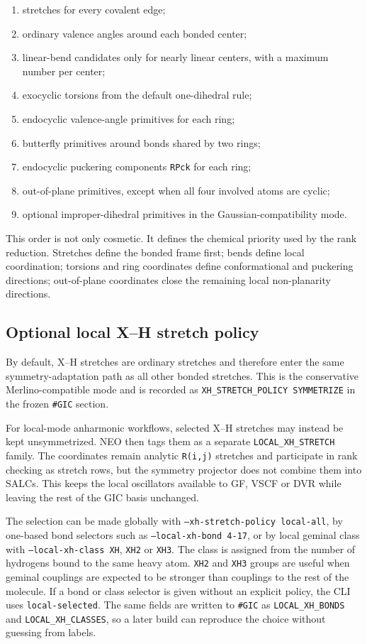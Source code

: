 \documentclass[11pt]{article}
\begin{document}
\begin{enumerate}
  \item stretches for every covalent edge;
  \item ordinary valence angles around each bonded center;
  \item linear-bend candidates only for nearly linear centers, with a maximum
        number per center;
  \item exocyclic torsions from the default one-dihedral rule;
  \item endocyclic valence-angle primitives for each ring;
  \item butterfly primitives around bonds shared by two rings;
  \item endocyclic puckering components \texttt{RPck} for each ring;
  \item out-of-plane primitives, except when all four involved atoms are cyclic;
  \item optional improper-dihedral primitives in the Gaussian-compatibility mode.
\end{enumerate}

This order is not only cosmetic.  It defines the chemical priority used by the
rank reduction.  Stretches define the bonded frame first; bends define local
coordination; torsions and ring coordinates define conformational and
puckering directions; out-of-plane coordinates close the remaining local
non-planarity directions.

\subsection{Optional local X--H stretch policy}

By default, X--H stretches are ordinary stretches and therefore enter the same
symmetry-adaptation path as all other bonded stretches.  This is the conservative
Merlino-compatible mode and is recorded as
\texttt{XH\_STRETCH\_POLICY SYMMETRIZE} in the frozen \texttt{\#GIC} section.

For local-mode anharmonic workflows, selected X--H stretches may instead be kept
unsymmetrized.  NEO then tags them as a separate
\texttt{LOCAL\_XH\_STRETCH} family.  The coordinates remain analytic
\texttt{R(i,j)} stretches and participate in rank checking as stretch rows, but
the symmetry projector does not combine them into SALCs.  This keeps the local
oscillators available to GF, VSCF or DVR while leaving the rest of the GIC basis
unchanged.

The selection can be made globally with \texttt{--xh-stretch-policy local-all},
by one-based bond selectors such as \texttt{--local-xh-bond 4-17}, or by local
geminal class with \texttt{--local-xh-class XH}, \texttt{XH2} or
\texttt{XH3}.  The class is assigned from the number of hydrogens bound to the
same heavy atom.  \texttt{XH2} and \texttt{XH3} groups are useful when geminal
couplings are expected to be stronger than couplings to the rest of the
molecule.  If a bond or class selector is given without an explicit policy, the
CLI uses \texttt{local-selected}.  The same fields are written to
\texttt{\#GIC} as \texttt{LOCAL\_XH\_BONDS} and
\texttt{LOCAL\_XH\_CLASSES}, so a later build can reproduce the choice without
guessing from labels.
\end{document}
